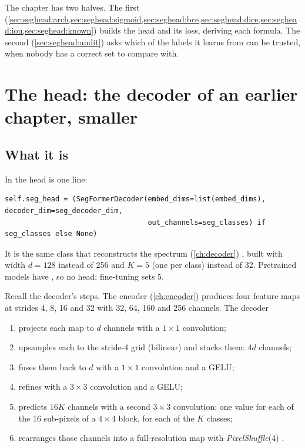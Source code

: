The chapter has two halves. The first (\cref{sec:seghead:arch,sec:seghead:sigmoid,sec:seghead:bce,sec:seghead:dice,sec:seghead:iou,sec:seghead:known})
builds the head and its loss, deriving each formula. The second (\cref{sec:seghead:audit}) asks which of the labels it learns
from can be trusted, when nobody has a correct set to compare with.

\section{The head: the decoder of an earlier chapter, smaller}\label{sec:seghead:arch}

\subsection{What it is}

In  the head is one line:
\begin{lstlisting}
self.seg_head = (SegFormerDecoder(embed_dims=list(embed_dims), decoder_dim=seg_decoder_dim,
                                  out_channels=seg_classes) if seg_classes else None)
\end{lstlisting}
It is the same  class that reconstructs the spectrum (\cref{ch:decoder}) \citep{xie2021segformer}, built
with width  $d = 128$ instead of 256 and  $K = 5$ (one per class) instead of 32. Pretrained
models have , so no head; fine-tuning sets 5.

Recall the decoder's steps. The encoder (\cref{ch:encoder}) produces four feature maps at strides 4, 8, 16 and 32 with 32, 64,
160 and 256 channels. The decoder
\begin{enumerate}
  \item projects each map to $d$ channels with a $1 \times 1$ convolution;
  \item upsamples each to the stride-4 grid (bilinear) and stacks them: $4d$ channels;
  \item fuses them back to $d$ with a $1 \times 1$ convolution and a GELU;
  \item refines with a $3 \times 3$ convolution and a GELU;
  \item predicts $16K$ channels with a second $3 \times 3$ convolution: one value for each of the 16 sub-pixels of a $4 \times 4$
    block, for each of the $K$ classes;
  \item rearranges those channels into a full-resolution map with \emph{PixelShuffle}(4) \citep{shi2016realtime}.
\end{enumerate}

